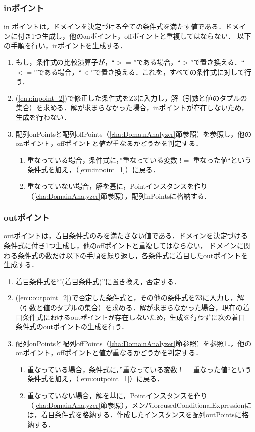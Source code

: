 \documentclass[uplatex, report, a4j, 10pt]{jsbook}
\begin{document}
\subsubsection{inポイント}
in ポイントは，ドメインを決定づける全ての条件式を満たす値である．ドメインに付き1つ生成し，他のonポイント，offポイントと重複してはならない．
以下の手順を行い，inポイントを生成する．
\begin{enumerate}
  \item\label{enu:inpoint_2} もし，条件式の比較演算子が，“$>=$”である場合，“$>$”で置き換える．“$<=$”である場合，“$<$”で置き換える．これを，すべての条件式に対して行う．
  \item\label{enu:inpoint_1} (\ref{enu:inpoint_2})で修正した条件式をZ3に入力し，解（引数と値のタプルの集合）を求める．解が求まらなかった場合，inポイントが存在しないため，生成を行わない．
  \item 配列onPointsと配列offPoints（\ref{cha:DomainAnalyzer}節参照）を参照し，他のonポイント，offポイントと値が重なるかどうかを判定する．
        \begin{enumerate}
          \item 重なっている場合，条件式に，”重なっている変数 $!=$ 重なった値“という条件式を加え，（\ref{enu:inpoint_1}）に戻る．
          \item 重なっていない場合，解を基に，Pointインスタンスを作り（\ref{cha:DomainAnalyzer}節参照），配列inPointsに格納する．
        \end{enumerate}
\end{enumerate}

\subsubsection{outポイント}
outポイントは，着目条件式のみを満たさない値である．ドメインを決定づける条件式に付き1つ生成し，他のoffポイントと重複してはならない，
ドメインに関わる条件式の数だけ以下の手順を繰り返し，各条件式に着目したoutポイントを生成する．
\begin{enumerate}
  \item\label{enu:outpoint_2} 着目条件式を“$!$(着目条件式)”に置き換え，否定する．
  \item\label{enu:outpoint_1} (\ref{enu:outpoint_2})で否定した条件式と，その他の条件式をZ3に入力し，解（引数と値のタプルの集合）を求める．解が求まらなかった場合，現在の着目条件式におけるoutポイントが存在しないため，生成を行わずに次の着目条件式のoutポイントの生成を行う．
  \item 配列onPointsと配列offPoints（\ref{cha:DomainAnalyzer}節参照）を参照し，他のonポイント，offポイントと値が重なるかどうかを判定する．
        \begin{enumerate}
          \item 重なっている場合，条件式に，”重なっている変数 $!=$ 重なった値“という条件式を加え，（\ref{enu:outpoint_1}）に戻る．
          \item 重なっていない場合，解を基に，Pointインスタンスを作り（\ref{cha:DomainAnalyzer}節参照），メンバforcusedConditionalExpressionには，着目条件式を格納する．作成したインスタンスを配列outPointsに格納する．
        \end{enumerate}
\end{enumerate}
\end{document}

